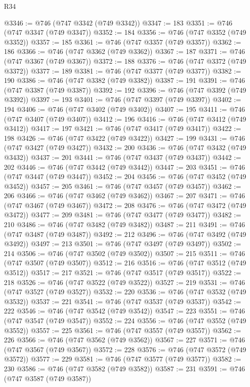 \begin{lexlean}{R34}
\begin{coremodule}
@3346 := @746 (@747 @3342 (@749 @3342))
@3347 := 183
@3351 := @746 (@747 @3347 (@749 @3347))
@3352 := 184
@3356 := @746 (@747 @3352 (@749 @3352))
@3357 := 185
@3361 := @746 (@747 @3357 (@749 @3357))
@3362 := 186
@3366 := @746 (@747 @3362 (@749 @3362))
@3367 := 187
@3371 := @746 (@747 @3367 (@749 @3367))
@3372 := 188
@3376 := @746 (@747 @3372 (@749 @3372))
@3377 := 189
@3381 := @746 (@747 @3377 (@749 @3377))
@3382 := 190
@3386 := @746 (@747 @3382 (@749 @3382))
@3387 := 191
@3391 := @746 (@747 @3387 (@749 @3387))
@3392 := 192
@3396 := @746 (@747 @3392 (@749 @3392))
@3397 := 193
@3401 := @746 (@747 @3397 (@749 @3397))
@3402 := 194
@3406 := @746 (@747 @3402 (@749 @3402))
@3407 := 195
@3411 := @746 (@747 @3407 (@749 @3407))
@3412 := 196
@3416 := @746 (@747 @3412 (@749 @3412))
@3417 := 197
@3421 := @746 (@747 @3417 (@749 @3417))
@3422 := 198
@3426 := @746 (@747 @3422 (@749 @3422))
@3427 := 199
@3431 := @746 (@747 @3427 (@749 @3427))
@3432 := 200
@3436 := @746 (@747 @3432 (@749 @3432))
@3437 := 201
@3441 := @746 (@747 @3437 (@749 @3437))
@3442 := 202
@3446 := @746 (@747 @3442 (@749 @3442))
@3447 := 203
@3451 := @746 (@747 @3447 (@749 @3447))
@3452 := 204
@3456 := @746 (@747 @3452 (@749 @3452))
@3457 := 205
@3461 := @746 (@747 @3457 (@749 @3457))
@3462 := 206
@3466 := @746 (@747 @3462 (@749 @3462))
@3467 := 207
@3471 := @746 (@747 @3467 (@749 @3467))
@3472 := 208
@3476 := @746 (@747 @3472 (@749 @3472))
@3477 := 209
@3481 := @746 (@747 @3477 (@749 @3477))
@3482 := 210
@3486 := @746 (@747 @3482 (@749 @3482))
@3487 := 211
@3491 := @746 (@747 @3487 (@749 @3487))
@3492 := 212
@3496 := @746 (@747 @3492 (@749 @3492))
@3497 := 213
@3501 := @746 (@747 @3497 (@749 @3497))
@3502 := 214
@3506 := @746 (@747 @3502 (@749 @3502))
@3507 := 215
@3511 := @746 (@747 @3507 (@749 @3507))
@3512 := 216
@3516 := @746 (@747 @3512 (@749 @3512))
@3517 := 217
@3521 := @746 (@747 @3517 (@749 @3517))
@3522 := 218
@3526 := @746 (@747 @3522 (@749 @3522))
@3527 := 219
@3531 := @746 (@747 @3527 (@749 @3527))
@3532 := 220
@3536 := @746 (@747 @3532 (@749 @3532))
@3537 := 221
@3541 := @746 (@747 @3537 (@749 @3537))
@3542 := 222
@3546 := @746 (@747 @3542 (@749 @3542))
@3547 := 223
@3551 := @746 (@747 @3547 (@749 @3547))
@3552 := 224
@3556 := @746 (@747 @3552 (@749 @3552))
@3557 := 225
@3561 := @746 (@747 @3557 (@749 @3557))
@3562 := 226
@3566 := @746 (@747 @3562 (@749 @3562))
@3567 := 227
@3571 := @746 (@747 @3567 (@749 @3567))
@3572 := 228
@3576 := @746 (@747 @3572 (@749 @3572))
@3577 := 229
@3581 := @746 (@747 @3577 (@749 @3577))
@3582 := 230
@3586 := @746 (@747 @3582 (@749 @3582))
@3587 := 231
@3591 := @746 (@747 @3587 (@749 @3587))

\end{coremodule}
\end{lexlean}
